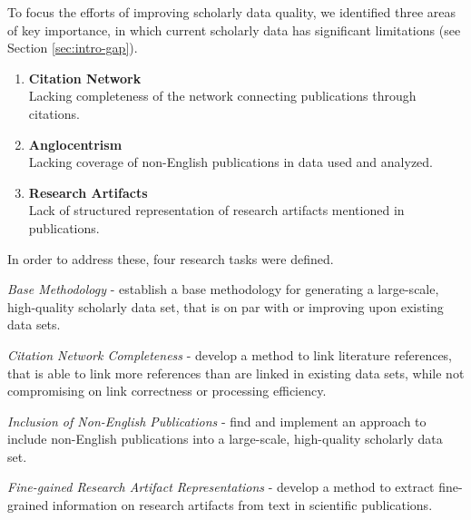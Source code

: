 To focus the efforts of improving scholarly data quality, we identified three areas of key importance, in which current scholarly data has significant limitations (see Section \ref{sec:intro-gap}).

\begin{enumerate}
    \item \textbf{Citation Network}\\
          Lacking completeness of the network connecting publications through citations.
    \item \textbf{Anglocentrism}\\
          Lacking coverage of non-English publications in data used and analyzed.
    \item \textbf{Research Artifacts}\\
           Lack of structured representation of research artifacts mentioned in publications.
\end{enumerate}

In order to address these, four research tasks were defined.

\begin{rtlist}
    \item \textit{Base Methodology} - establish a base methodology for generating a large-scale, high-quality scholarly data set, that is on par with or improving upon existing data sets.
    \item \textit{Citation Network Completeness} - develop a method to link literature references, that is able to link more references than are linked in existing data sets, while not compromising on link correctness or processing efficiency.
    \item \textit{Inclusion of Non-English Publications} - find and implement an approach to include non-English publications into a large-scale, high-quality scholarly data set.
    \item \textit{Fine-gained Research Artifact Representations} - develop a method to extract fine-grained information on research artifacts from text in scientific publications.
\end{rtlist}

